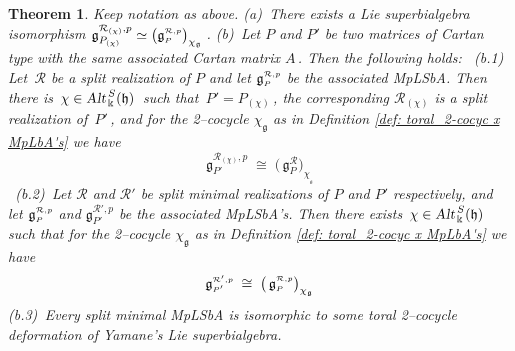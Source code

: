 \documentclass[12pt,reqno,twoside,a4paper]{amsart}
\numberwithin{equation}{section}
\newtheorem{theorem}[lema]{Theorem}
\theoremstyle{definition}
\newtheorem{free text}[lema]{}
\theoremstyle{remark}
\newcommand{\R}{{\mathcal R}}
\def \Ppicc {{\scriptscriptstyle P}}
\def \lieg{\mathfrak{g}}
\def \liegRpP{\mathfrak{g}^{\raise1pt\hbox{$ \scriptscriptstyle \mathcal{R},p $}}_\Ppicc}
\def \lieh{\mathfrak{h}}
\theoremstyle{plain}
\begin{document}
\begin{theorem}  \label{thm: 2-cocycle-def-MpLSbA}
%
 Keep notation as above.
%
 \vskip2pt
%
   (a)\,  There exists a Lie superbialgebra isomorphism
%
  $ \lieg_{P_{(\chi)}}^{\R_{(\chi)},p} \simeq  {\big( \liegRpP \big)}_{\chi_\lieg} \; $.
%
 \vskip3pt
%
   (b)\,  Let  $ P $  and  $ P' $  be two matrices of Cartan type with the same associated Cartan matrix $ A \, $.  Then the following holds:
%
 \vskip3pt
%
   \, (b.1)\,  Let  $ \, \R $  be a  \textsl{split}  realization of  $ P $  and let
   $ \liegRpP $
   be the associated MpLSbA.  Then there is  $ \, \chi \in \text{\sl Alt}_{\,\Bbbk}^{\,S}(\lieh) \, $ such that
   $ \, P' = P_{(\chi)} \, $,  the corresponding $ \R_{(\chi)} $  is a  \textsl{split}  realization of  $ \, P' \, $,
   and for the 2--cocycle  $ \chi_\lieg $  as in Definition \ref{def: toral_2-cocyc x MpLbA's}  we have
%
  $$
  \lieg_{\scriptscriptstyle P'}^{\scriptscriptstyle \R_{(\chi)},p}  \; \cong \;
  {\big(\, \lieg_\Ppicc^{\scriptscriptstyle \R} \big)}_{\chi_{{}_\lieg}}  $$
%
 \vskip3pt
%
   \, (b.2)\,  Let  $ \R $  and  $ \R' $  be  \textsl{split minimal}
   realizations of  $ P $  and  $ P' $
respectively, and let  $ \liegRpP $  and
$ \lieg_{\scriptscriptstyle P'}^{\scriptscriptstyle \R',p} $
be the associated MpLSbA's.
Then there exists  $ \, \chi \in \text{\sl Alt}_{\,\Bbbk}^{\,S}(\lieh) \, $
such that for the 2--cocycle  $ \chi_\lieg $
as in Definition \ref{def: toral_2-cocyc x MpLbA's}  we have
%
  $$
  \lieg_{\scriptscriptstyle P'}^{\scriptscriptstyle \R',p}  \; \cong \;
  {\big(\, \liegRpP \big)}_{\chi_{\lieg}}
  $$
%
 \vskip3pt
%
   (b.3)\,  Every split minimal MpLSbA is isomorphic to some
   toral 2--cocycle deformation of Yamane's Lie superbialgebra.
%
\end{theorem}

\smallskip
\end{document}
